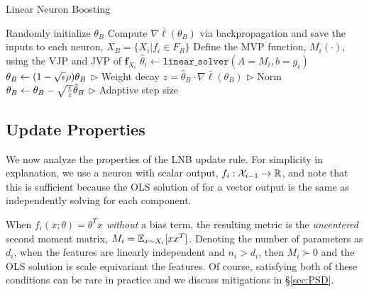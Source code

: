 \begin{algorithm}[tb]
\caption{Linear Neuron Boosting}
\label{algo1}
\begin{algorithmic}[1]
\STATE Randomly initialize $\theta_B$
\STATE Compute $\nabla \bar\ell(\theta_B)$ via backpropagation and save the 
inputs to each neuron, $X_B = \{X_i | f_i \in F_B\}$ \label{algo:bp}
      \STATE Define the  MVP function, $M_i(\cdot)$, using the VJP and JVP of $\mathbf{f}_{X_i}$
      \STATE $\hat{\theta}_i \gets \texttt{linear\_solver}(A=M_i, b=g_i)$
   \ENDFOR
   \STATE $\theta_B \gets (1-\sqrt{{\epsilon}}\rho)\theta_B$  \hfill $\triangleright$ Weight decay
   \STATE $z = \hat{\theta}_B \cdot \nabla \bar \ell(\theta_B)$  \hfill $\triangleright$ Norm
\STATE $\theta_B \gets \theta_B - \sqrt{\frac{{\epsilon}}{z}} \hat{\theta}_B$ \hfill $\triangleright$ Adaptive step size
\ENDFOR
{}
\end{algorithmic}
\end{algorithm}

\subsection{Update Properties}
\label{sec:WW}
We now analyze the properties of the LNB update rule. For simplicity in explanation,
we use a neuron with scalar output, $f_i : {\mathcal{X}}_{i-1} \to {\mathbb{R}}$, and note that this is sufficient because
the OLS solution of  for a vector output is the same as independently solving for each component.

When $f_i(x;\theta) = \theta^Tx$ \emph{without} a bias term, the resulting metric is the \emph{uncentered}
second moment matrix, $M_i = \mathbb{E}_{x \sim X_i}[xx^T]$. Denoting the number of parameters as $d_i$,
when the features are linearly independent and $n_i > d_i$, then $M_i \succ 0$ and the
OLS solution is scale equivariant \wrt the features. Of course, satisfying both of these
conditions can be rare in practice and we discuss mitigations in \S \ref{sec:PSD}.

